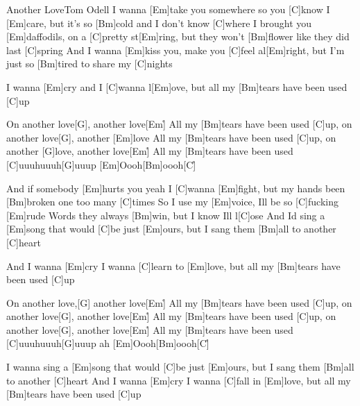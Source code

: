 \documentclass[../main.tex]{subfiles}
\begin{document}
\begin{song}{Another Love}{Tom Odell}{}
I wanna [Em]take you somewhere so you [C]know I [Em]care,
but it's so [Bm]cold and I don't know [C]where
I brought you [Em]daffodils, on a [C]pretty st[Em]ring,
but they won't [Bm]flower like they did last [C]spring
And I wanna [Em]kiss you, make you [C]feel al[Em]right,
but I'm just so [Bm]tired to share my [C]nights

I wanna [Em]cry and I [C]wanna l[Em]ove, but all my [Bm]tears have been used [C]up

On another love[G], another love[Em]{\h}
All my [Bm]tears have been used [C]up, on another love[G], another [Em]love
All my [Bm]tears have been used [C]up, on another [G]love, another love[Em]{\h}
All my [Bm]tears have been used [C]uuuhuuuh[G]uuup
[Em]Oooh[Bm]oooh[C]{\h}

And if somebody [Em]hurts you yeah I [C]wanna [Em]fight,
but my hands been [Bm]broken one too many [C]times
So I use my [Em]voice, Ill be so [C]fucking [Em]rude
Words they always [Bm]win, but I know Ill l[C]ose
And Id sing a [Em]song that would [C]be just [Em]ours,
but I sang them [Bm]all to another [C]heart

And I wanna [Em]cry I wanna [C]learn to [Em]love, but all my [Bm]tears have been used [C]up

On another love,[G] another love[Em]{\h}
All my [Bm]tears have been used [C]up, on another love[G], another love[Em]{\h}
All my [Bm]tears have been used [C]up, on another love[G], another love[Em]{\h}
All my [Bm]tears have been used [C]uuuhuuuh[G]uuup ah
[Em]Oooh[Bm]oooh[C]{\h}

I wanna sing a [Em]song that would [C]be just [Em]ours,
but I sang them [Bm]all to another [C]heart
And I wanna [Em]cry I wanna [C]fall in [Em]love,
but all my [Bm]tears have been used [C]up

\end{song}
\end{document}
